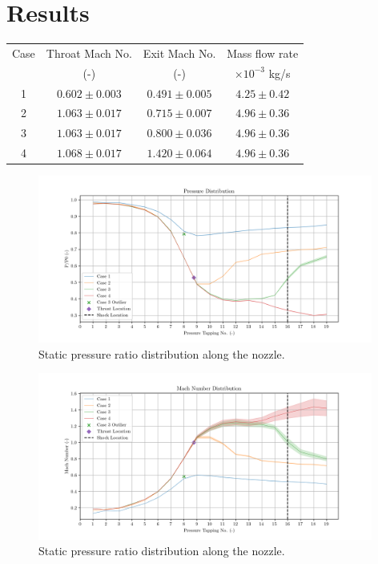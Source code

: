 \documentclass{article}
\begin{document}
\section{Results}

\begin{center}
    \begin{tabular}{|c|c|c|c|}
    \hline 
    Case & Throat Mach No.  & Exit Mach No. & Mass flow rate\\
     & (-) & (-) & $\times 10^{-3}$ kg/s\\
    \hline 
    1 & $0.602\pm 0.003$ & $0.491\pm 0.005$ & $ 4.25\pm 0.42  $ \\
    2 & $1.063\pm 0.017$ & $0.715\pm 0.007$ & $ 4.96\pm 0.36  $ \\
    3 & $1.063\pm 0.017$ & $0.800\pm 0.036$ & $ 4.96\pm 0.36 $ \\
    4 & $1.068\pm 0.017$ & $1.420\pm 0.064$ & $ 4.96\pm 0.36 $ \\
    \hline
    \end{tabular}
    \label{tab:1}
\end{center}

\begin{figure}[H]
    \centering
    \includegraphics[width=0.98\textwidth]{../Supersonic_Nozzle/pressure_ratio_distribution_corrected.png}
    \caption{Static pressure ratio distribution along the nozzle.}
    \label{fig:pressure_distribution}
\end{figure}

\begin{figure}[H]
    \centering
    \includegraphics[width=0.98\textwidth]{../Supersonic_Nozzle/mach_number_distribution_corrected.png}
    \caption{Static pressure ratio distribution along the nozzle.}
    \label{fig:mach_distribution}
\end{figure}
\end{document}
